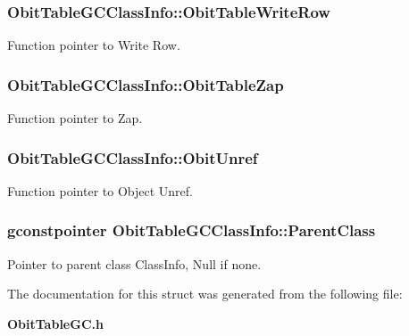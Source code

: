\subsubsection{ {\bf Obit\-Table\-GCClass\-Info::Obit\-Table\-Write\-Row}}\label{structObitTableGCClassInfo_o26}


Function pointer to Write Row. 

\subsubsection{ {\bf Obit\-Table\-GCClass\-Info::Obit\-Table\-Zap}}\label{structObitTableGCClassInfo_o19}


Function pointer to Zap. 

\subsubsection{ {\bf Obit\-Table\-GCClass\-Info::Obit\-Unref}}\label{structObitTableGCClassInfo_o11}


Function pointer to Object Unref. 

\subsubsection{\setlength{\rightskip}{0pt plus 5cm}gconstpointer {\bf Obit\-Table\-GCClass\-Info::Parent\-Class}}\label{structObitTableGCClassInfo_o3}


Pointer to parent class Class\-Info, Null if none. 



The documentation for this struct was generated from the following file:\begin{CompactItemize}
\item 
{\bf Obit\-Table\-GC.h}\end{CompactItemize}
